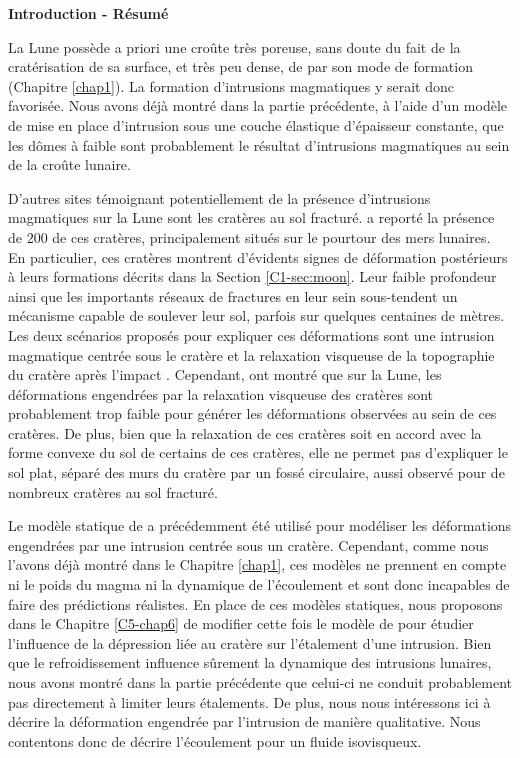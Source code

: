 \thispagestyle{plain}
\begin{flushleft}
  \Large \vspace{.5cm} \textbf{Introduction - Résumé}
\end{flushleft}

La Lune possède  a priori une croûte très poreuse,  sans doute du fait
de la cratérisation de sa surface, et  très peu dense, de par son mode
de  formation  (Chapitre   \ref{chap1}).   La  formation  d’intrusions
magmatiques y serait  donc favorisée.  Nous avons déjà  montré dans la
partie précédente, à  l’aide d’un modèle de mise  en place d’intrusion
sous  une couche  élastique  d’épaisseur constante,  que  les dômes  à
faible sont probablement le  résultat d’intrusions magmatiques au sein
de la croûte lunaire.

D’autres sites témoignant potentiellement  de la présence d’intrusions
magmatiques  sur   la  Lune  sont   les  cratères  au   sol  fracturé.
\citet{Schultz:1976kt} a reporté la présence de $200$ de ces cratères,
principalement  situés   sur  le  pourtour  des   mers  lunaires.   En
particulier, ces  cratères montrent  d’évidents signes  de déformation
postérieurs   à    leurs   formations   décrits   dans    la   Section
\ref{C1-sec:moon}.  Leur  faible profondeur  ainsi que  les importants
réseaux de fractures en leur sein sous-tendent un mécanisme capable de
soulever leur sol, parfois sur  quelques centaines de mètres. Les deux
scénarios proposés pour expliquer  ces déformations sont une intrusion
magmatique centrée  sous le cratère  et la relaxation visqueuse  de la
topographie   du   cratère  après   l’impact   \citep{Wichman:1996bj}.
Cependant,  \citet{Dombard:2001gs} ont  montré  que sur  la Lune,  les
déformations engendrées par la  relaxation visqueuse des cratères sont
probablement trop  faible pour  générer les déformations  observées au
sein de ces cratères. De plus,  bien que la relaxation de ces cratères
soit  en accord  avec  la forme  convexe  du sol  de  certains de  ces
cratères, elle ne permet pas d’expliquer  le sol plat, séparé des murs
du cratère  par un  fossé circulaire, aussi  observé pour  de nombreux
cratères au sol fracturé.

Le  modèle  statique  de  \citet{Pollard:1973ho}  a  précédemment  été
utilisé pour  modéliser les déformations engendrées  par une intrusion
centrée sous  un cratère.  Cependant,  comme nous l’avons  déjà montré
dans le Chapitre \ref{chap1}, ces modèles  ne prennent en compte ni le
poids du magma ni la dynamique de l’écoulement et sont donc incapables
de faire des prédictions réalistes. En place de ces modèles statiques,
nous proposons dans le Chapitre  \ref{C5-chap6} de modifier cette fois
le  modèle de  \citet{Michaut:2011kg} pour  étudier l’influence  de la
dépression liée au  cratère sur l’étalement d’une  intrusion. Bien que
le  refroidissement influence  sûrement  la  dynamique des  intrusions
lunaires, nous avons montré dans  la partie précédente que celui-ci ne
conduit probablement  pas directement  à limiter leurs  étalements. De
plus, nous nous intéressons ici à décrire la déformation engendrée par
l’intrusion de  manière qualitative.  Nous contentons  donc de décrire
l’écoulement pour un fluide isovisqueux.

